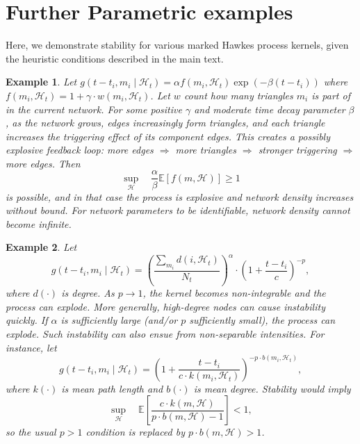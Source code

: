\documentclass[12pt]{article}
\newtheorem{example}{Example}
\begin{document}
\section{Further Parametric examples}\label{app:stationarity}

Here, we demonstrate stability for various marked Hawkes process kernels, given the heuristic conditions described in the main text.

\begin{example}\label{ex:exponential}
Let $g(t-t_i,m_i\mid\mathcal{H}_t)=\alpha f(m_i,\mathcal{H}_t)\exp(-\beta(t-t_i))$ where $f(m_i,\mathcal{H}_t)=1+\gamma\cdot w(m_i,\mathcal{H}_t)$. Let $w$ count how many triangles $m_i$ is part of in the current network. For some positive $\gamma$ and moderate time decay parameter $\beta$, as the network grows, edges increasingly form triangles, and each triangle increases the triggering effect of its component edges. This creates a possibly explosive feedback loop: more edges $\Rightarrow$ more triangles $\Rightarrow$ stronger triggering $\Rightarrow$ more edges. Then
\[
\sup_\mathcal{H}\quad \frac{\alpha}{\beta}\mathbb{E}[f(m,\mathcal{H})]\ge 1
\]
is possible, and in that case the process is explosive and network density increases without bound. For network parameters to be identifiable, network density cannot become infinite.
\end{example}

\begin{example}\label{ex:powerlaw}
Let
\[
g(t-t_i,m_i\mid\mathcal{H}_t)=\left(\frac{\sum_{m_i}d(i,\mathcal{H}_t)}{N_t}\right)^\alpha \cdot \left(1+\frac{t-t_i}{c}\right)^{-p},
\]
where $d(\cdot)$ is degree. As $p\to 1$, the kernel becomes non-integrable and the process can explode. More generally, high-degree nodes can cause instability quickly. If $\alpha$ is sufficiently large (and/or $p$ sufficiently small), the process can explode. Such instability can also ensue from non-separable intensities. For instance, let
\[
g(t-t_i,m_i\mid\mathcal{H}_t) =\left(1+\frac{t-t_i}{c\cdot k(m_i,\mathcal{H}_t)}\right)^{-p \cdot b(m_i,\mathcal{H}_t)},
\]
where $k(\cdot)$ is mean path length and $b(\cdot)$ is mean degree. Stability would imply
\[
\sup_\mathcal{H} \quad  \mathbb{E}\left[\frac{c\cdot k(m,\mathcal{H}) }{p \cdot b(m,\mathcal{H}) -1}\right]< 1,
\]
so the usual $p>1$ condition is replaced by $p \cdot b(m,\mathcal{H})>1$.
\end{example}
\end{document}
